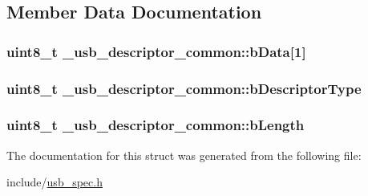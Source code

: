 \subsection{Member Data Documentation}
\hypertarget{struct__usb__descriptor__common_a8f30ceceee4ee72bbad44299e1e1fbca}{
\subsubsection[{b\-Data}]{\setlength{\rightskip}{0pt plus 5cm}uint8\-\_\-t \-\_\-usb\-\_\-descriptor\-\_\-common\-::b\-Data\mbox{[}1\mbox{]}}}\label{struct__usb__descriptor__common_a8f30ceceee4ee72bbad44299e1e1fbca}
\hypertarget{struct__usb__descriptor__common_a50af8e651a87939469875e0c25fdf085}{
\subsubsection[{b\-Descriptor\-Type}]{\setlength{\rightskip}{0pt plus 5cm}uint8\-\_\-t \-\_\-usb\-\_\-descriptor\-\_\-common\-::b\-Descriptor\-Type}}\label{struct__usb__descriptor__common_a50af8e651a87939469875e0c25fdf085}
\hypertarget{struct__usb__descriptor__common_a19a768e7c2bd7f71975e958a997696fc}{
\subsubsection[{b\-Length}]{\setlength{\rightskip}{0pt plus 5cm}uint8\-\_\-t \-\_\-usb\-\_\-descriptor\-\_\-common\-::b\-Length}}\label{struct__usb__descriptor__common_a19a768e7c2bd7f71975e958a997696fc}


The documentation for this struct was generated from the following file\-:\begin{DoxyCompactItemize}
\item 
include/\hyperlink{usb__spec_8h}{usb\-\_\-spec.\-h}\end{DoxyCompactItemize}
